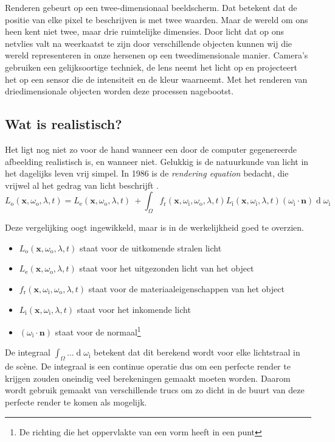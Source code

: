 \documentclass[12pt, a4paper]{article}
\begin{document}
Renderen gebeurt op een twee-dimensionaal beeldscherm. Dat betekent dat de positie van elke pixel te beschrijven is met twee waarden. Maar de wereld om ons heen kent niet twee, maar drie ruimtelijke dimensies. Door licht dat op ons netvlies valt na weerkaatst te zijn door verschillende objecten kunnen wij die wereld representeren in onze hersenen op een tweedimensionale manier. Camera's gebruiken een gelijksoortige techniek, de lens neemt het licht op en projecteert het op een sensor die de intensiteit en de kleur waarneemt. Met het renderen van driedimensionale objecten worden deze processen nagebootst. 

\subsection{Wat is realistisch?}
Het ligt nog niet zo voor de hand wanneer een door de computer gegenereerde afbeelding realistisch is, en wanneer niet. Gelukkig is de natuurkunde van licht in het dagelijks leven vrij simpel. In 1986 is de \textit{rendering equation} bedacht, die vrijwel al het gedrag van licht beschrijft \cite{RenderingEquation}.
\[
L_{\text{o}}(\mathbf x, \omega_{\text{o}}, \lambda, t) = L_{\text{e}}(\mathbf x, \omega_{\text{o}}, \lambda, t) \ + \int_\Omega f_{\text{r}}(\mathbf x, \omega_{\text{i}}, \omega_{\text{o}}, \lambda, t) L_{\text{i}}(\mathbf x, \omega_{\text{i}}, \lambda, t) (\omega_{\text{i}}\cdot\mathbf n) \operatorname d \omega_{\text{i}}
\]

Deze vergelijking oogt ingewikkeld, maar is in de werkelijkheid goed te overzien. 
\begin{itemize}
	\item $L_{\text{o}}(\mathbf x, \omega_{\text{o}}, \lambda, t)$ staat voor de uitkomende stralen licht
	\item $L_{\text{e}}(\mathbf x, \omega_{\text{o}}, \lambda, t)$ staat voor het uitgezonden licht van het object
	\item $	f_{\text{r}}(\mathbf x, \omega_{\text{i}}, \omega_{\text{o}}, \lambda, t)$ staat voor de materiaaleigenschappen van het object
	\item $L_{\text{i}}(\mathbf x, \omega_{\text{i}}, \lambda, t)$ staat voor het inkomende licht
	\item $(\omega_{\text{i}}\cdot\mathbf n)$ staat voor de normaal\footnote{De richting die het oppervlakte van een vorm heeft in een punt}
\end{itemize}

De integraal $\int_\Omega \dots \operatorname d\omega_{\text{i}}$ betekent dat dit berekend wordt voor elke lichtstraal in de scène. De integraal is een continue operatie dus om een perfecte render te krijgen zouden oneindig veel berekeningen gemaakt moeten worden. Daarom wordt gebruik gemaakt van verschillende trucs om zo dicht in de buurt van deze perfecte render te komen als mogelijk.
\end{document}
